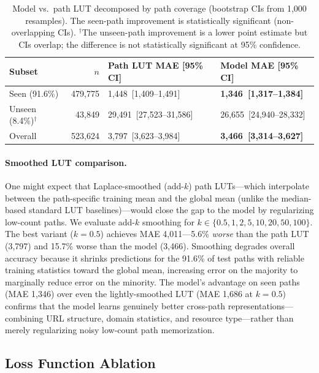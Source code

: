 \documentclass[sigconf,nonacm]{acmart}
\begin{document}
\begin{table}[t]
\centering
\small
\begin{tabular}{lrll}
\toprule
Subset & $n$ & Path LUT MAE [95\% CI] & Model MAE [95\% CI] \\
\midrule
Seen (91.6\%) & 479,775 & 1,448\ [1,409--1,491] & \textbf{1,346\ [1,317--1,384]} \\
Unseen (8.4\%)$^\dagger$ & 43,849 & 29,491\ [27,523--31,586] & 26,655\ [24,940--28,332] \\
\midrule
Overall & 523,624 & 3,797\ [3,623--3,984] & \textbf{3,466\ [3,314--3,627]} \\
\bottomrule
\end{tabular}
\caption{Model vs.\ path LUT decomposed by path coverage (bootstrap CIs from 1,000 resamples). The seen-path improvement is statistically significant (non-overlapping CIs). $^\dagger$The unseen-path improvement is a lower point estimate but CIs overlap; the difference is not statistically significant at 95\% confidence.}
\label{tab:decomposition}
\end{table}

\paragraph{Smoothed LUT comparison.}
One might expect that Laplace-smoothed (add-$k$) path LUTs---which interpolate between the path-specific training mean and the global mean (unlike the median-based standard LUT baselines)---would close the gap to the model by regularizing low-count paths.
We evaluate add-$k$ smoothing for $k \in \{0.5, 1, 2, 5, 10, 20, 50, 100\}$.
The best variant ($k=0.5$) achieves MAE 4{,}011---5.6\% \emph{worse} than the path LUT (3{,}797) and 15.7\% worse than the model (3{,}466).
Smoothing degrades overall accuracy because it shrinks predictions for the 91.6\% of test paths with reliable training statistics toward the global mean, increasing error on the majority to marginally reduce error on the minority.
The model's advantage on seen paths (MAE 1{,}346) over even the lightly-smoothed LUT (MAE 1{,}686 at $k=0.5$) confirms that the model learns genuinely better cross-path representations---combining URL structure, domain statistics, and resource type---rather than merely regularizing noisy low-count path memorization.

\subsection{Loss Function Ablation}
\label{sec:loss-ablation}
\end{document}
